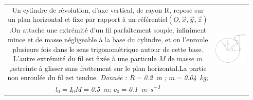 \begin{Exercise}[title=(*)Enroulement d'un fil sur un cylindre]
	\begin{tabular}{cc}
		\begin{minipage}{.5\linewidth}
	Un cylindre de révolution, d’axe vertical, de rayon	R,	repose sur un plan horizontal et fixe par rapport	à un référentiel$(O,\vec{x},\vec{y},\vec{z})$.On attache une extrémité d’un fil parfaitement souple,	infiniment mince et de masse négligeable à la base du cylindre, et on l’enroule plusieurs fois dans le sens trigonométrique autour de cette base.
L’autre extrémité du fil est fixée à une particule $M$
de masse $m$,astreinte à glisser sans frottement sur le plan horizontal.La partie non enroulée du fil est tendue.
\emph{Donnée : $R=$\SI{0.2}{m} ; $m=$\SI{0.04}{kg}; $l_0=I_0M = $\SI{0.5}{m}; $v_0 = $\SI{0.1}{\m\per\s}}
		\end{minipage} &
	\begin{minipage}{.4\linewidth}
	\includegraphics[width=\textwidth]{../fig/Cylindre.png}
	\end{minipage}
	\end{tabular}


\end{Exercise}
